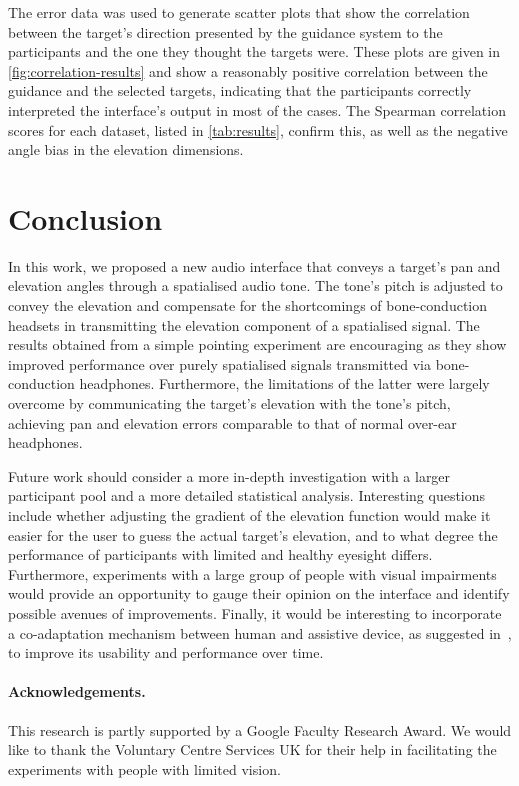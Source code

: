 \documentclass{llncs}
\begin{document}
The error data was used to generate scatter plots that show the correlation between the target's direction presented by the guidance system to the participants and the one they thought the targets were.
These plots are given in \cref{fig:correlation-results} and show a reasonably positive correlation between the guidance and the selected targets, indicating that the participants correctly interpreted the interface's output in most of the cases. 
The Spearman correlation scores for each dataset, listed in \cref{tab:results}, confirm this, as well as the negative angle bias in the elevation dimensions.

\section{Conclusion}\label{sec:conclusion}

In this work, we proposed a new audio interface that conveys a target's pan and elevation angles through a spatialised audio tone.
The tone's pitch is adjusted to convey the elevation and compensate for the shortcomings of bone-conduction headsets in transmitting the elevation component of a spatialised signal.
The results obtained from a simple pointing experiment are encouraging as they show improved performance over purely spatialised signals transmitted via bone-conduction headphones.
Furthermore, the limitations of the latter were largely overcome by communicating the target's elevation with the tone's pitch, achieving pan and elevation errors comparable to that of normal over-ear headphones.

Future work should consider a more in-depth investigation with a larger participant pool and a more detailed statistical analysis.
Interesting questions include whether adjusting the gradient of the elevation function would make it easier for the user to guess the actual target's elevation, and to what degree the performance of participants with limited and healthy eyesight differs.
Furthermore, experiments with a large group of people with visual impairments would provide an opportunity to gauge their opinion on the interface and identify possible avenues of improvements.
Finally, it would be interesting to incorporate a co-adaptation mechanism between human and assistive device, as suggested in~\cite{gallina2015progressive}, to improve its usability and performance over time.

\paragraph{{\bf Acknowledgements.}}\label{sec:acknowledge}
This research is partly supported by a Google Faculty Research Award.
We would like to thank the Voluntary Centre Services UK for their help in facilitating the experiments with people with limited vision. 



\end{document}
